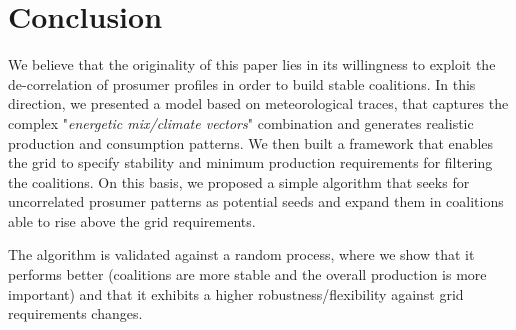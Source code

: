 \documentclass[conference]{IEEEtran}
\begin{document}



\section{Conclusion}
\label{sec: conclusion}

We believe that the originality of this paper lies in its willingness to exploit the de-correlation of prosumer profiles in order to build stable coalitions. In this direction, we presented a model based on meteorological traces, that captures the complex "\textit{energetic mix/climate vectors}" combination and generates realistic production and consumption patterns. We then built a framework that enables the grid to specify stability and minimum production requirements for filtering the coalitions. On this basis, we proposed a simple algorithm that seeks for uncorrelated prosumer patterns as potential seeds and expand them in coalitions able to rise above the grid requirements.

The algorithm is validated against a random process, where we show that it performs better (coalitions are more stable and the overall production is more important) and that it exhibits a higher robustness/flexibility against grid requirements changes.

\end{document}
